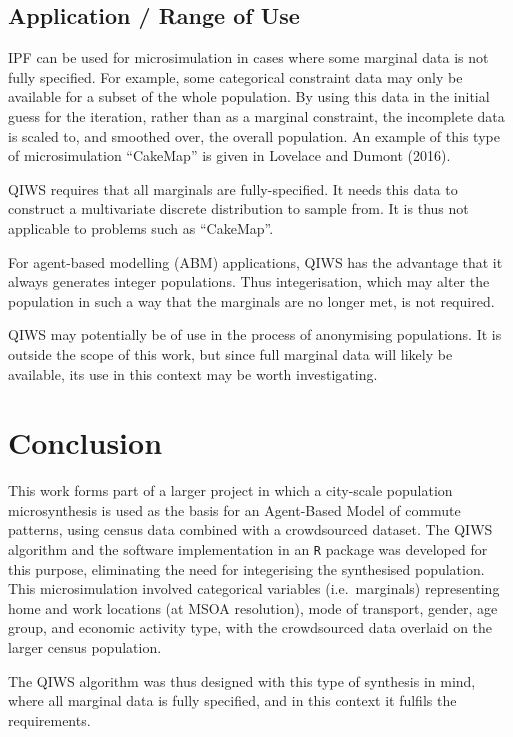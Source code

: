\documentclass{JASSS}
\begin{document}
\subsection{Application / Range of Use}\label{application-range-of-use}

IPF can be used for microsimulation in cases where some marginal data is
not fully specified. For example, some categorical constraint data may
only be available for a subset of the whole population. By using this
data in the initial guess for the iteration, rather than as a marginal
constraint, the incomplete data is scaled to, and smoothed over, the
overall population. An example of this type of microsimulation
``CakeMap'' is given in Lovelace and Dumont (2016).

QIWS requires that all marginals are fully-specified. It needs this data
to construct a multivariate discrete distribution to sample from. It is
thus not applicable to problems such as ``CakeMap''.

For agent-based modelling (ABM) applications, QIWS has the advantage
that it always generates integer populations. Thus integerisation, which
may alter the population in such a way that the marginals are no longer
met, is not required.

QIWS may potentially be of use in the process of anonymising
populations. It is outside the scope of this work, but since full
marginal data will likely be available, its use in this context may be
worth investigating.

\section{Conclusion}\label{conclusion}

This work forms part of a larger project in which a city-scale
population microsynthesis is used as the basis for an Agent-Based Model
of commute patterns, using census data combined with a crowdsourced
dataset. The QIWS algorithm and the software implementation in an
\texttt{R} package was developed for this purpose, eliminating the need
for integerising the synthesised population. This microsimulation
involved categorical variables (i.e.~marginals) representing home and
work locations (at MSOA resolution), mode of transport, gender, age
group, and economic activity type, with the crowdsourced data overlaid
on the larger census population.

The QIWS algorithm was thus designed with this type of synthesis in
mind, where all marginal data is fully specified, and in this context it
fulfils the requirements.
\end{document}
